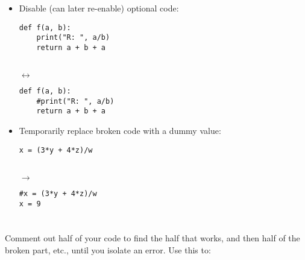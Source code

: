 \documentclass{handout}
\begin{document}
\begin{itemize}

\item Disable (can later re-enable) optional code: \\
\noindent
\begin{minipage}[t]{0.45\columnwidth}
\begin{lstlisting}
def f(a, b):
    print("R: ", a/b)
    return a + b + a
\end{lstlisting}
\end{minipage}
\begin{minipage}[t]{0.05\columnwidth}
\  \\
\hspace*{1ex}$\leftrightarrow$
\end{minipage}
\begin{minipage}[t]{0.45\columnwidth}
\begin{lstlisting}
def f(a, b):
    #print("R: ", a/b)
    return a + b + a
\end{lstlisting}
\end{minipage}

\item Temporarily replace broken code with a dummy value: \\
\noindent
\begin{minipage}[t]{0.45\columnwidth}
\begin{lstlisting}
x = (3*y + 4*z)/w
\end{lstlisting}
\end{minipage}
\begin{minipage}[t]{0.05\columnwidth}
\  \\
\hspace*{1ex}$\rightarrow$
\end{minipage}
\begin{minipage}[t]{0.45\columnwidth}
\begin{lstlisting}
#x = (3*y + 4*z)/w
x = 9
\end{lstlisting}
\end{minipage}

\end{itemize}


\section{}

Comment out half of your code to find the half that works, and then half of the broken part, etc., until you isolate an error. Use this to:
\end{document}
